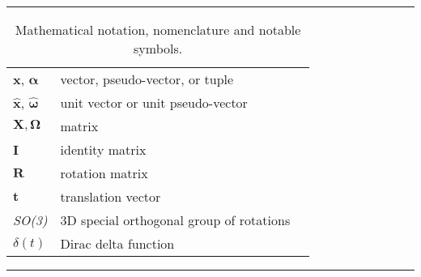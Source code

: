 \begin{table*}[!h]
  \scriptsize
  \centering
  \noindent\rule{\textwidth}{0.5pt}
  \begin{tabular}{lll}
    $\mathbf{x}$, $\bm{\alpha}$ & vector, pseudo-vector, or tuple\\
    $\mathbf{\hat{x}}$, $\bm{\hat{\omega}}$& unit vector or unit pseudo-vector\\
    $\mathbf{X}, \bm{\Omega}$ & matrix \\
    $\mathbf{I}$ & identity matrix \\
    $\mathbf{R}$ & rotation matrix \\
    $\mathbf{t}$ & translation vector \\
    \emph{SO(3)} & 3D special orthogonal group of rotations\\
    $\delta(t)$ & Dirac delta function \\
  \end{tabular}
  \noindent\rule{\textwidth}{0.5pt}
  \caption{Mathematical notation, nomenclature and notable symbols.}
  \label{tab:mathematical_notation}
\end{table*}

